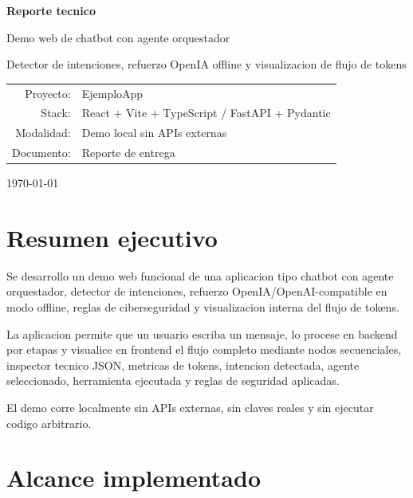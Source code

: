 \documentclass[12pt,letterpaper]{article}
\begin{document}
\begin{titlepage}
  \centering
  \vspace*{2.0cm}
  {\Huge\bfseries Reporte tecnico\par}
  \vspace{0.4cm}
  {\Large Demo web de chatbot con agente orquestador\par}
  \vspace{0.6cm}
  {\large Detector de intenciones, refuerzo OpenIA offline y visualizacion de flujo de tokens\par}
  \vfill
  \begin{tabular}{rl}
    Proyecto: & EjemploApp \\
    Stack: & React + Vite + TypeScript / FastAPI + Pydantic \\
    Modalidad: & Demo local sin APIs externas \\
    Documento: & Reporte de entrega \\
  \end{tabular}
  \vfill
  {\large \today\par}
\end{titlepage}

\tableofcontents
\newpage

\section{Resumen ejecutivo}

Se desarrollo un demo web funcional de una aplicacion tipo chatbot con agente orquestador, detector de intenciones, refuerzo OpenIA/OpenAI-compatible en modo offline, reglas de ciberseguridad y visualizacion interna del flujo de tokens.

La aplicacion permite que un usuario escriba un mensaje, lo procese en backend por etapas y visualice en frontend el flujo completo mediante nodos secuenciales, inspector tecnico JSON, metricas de tokens, intencion detectada, agente seleccionado, herramienta ejecutada y reglas de seguridad aplicadas.

El demo corre localmente sin APIs externas, sin claves reales y sin ejecutar codigo arbitrario.

\section{Alcance implementado}
\end{document}
